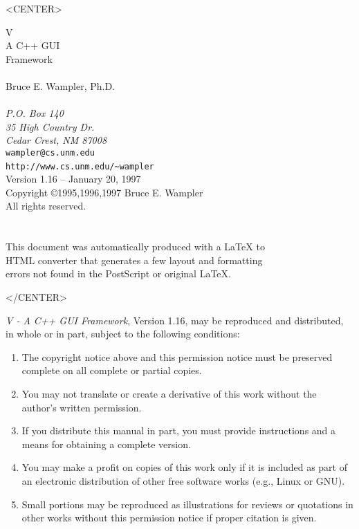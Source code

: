 \documentclass[letterpaper,draft]{book}
\begin{document}
\thispagestyle{empty}
\begin{rawhtml}
<CENTER>
\end{rawhtml}
\begin{center}
\LARGE V \\ \Large A C++ GUI \\ Framework \\
~ \\
\large Bruce E. Wampler, Ph.D. \\
\normalsize ~ \\
 \emph{P.O. Box 140} \\ 
 \emph{35 High Country Dr.} \\ 
 \emph{Cedar Crest, NM 87008} \\ 
 \texttt{wampler@cs.unm.edu} \\
 \texttt{http://www.cs.unm.edu/\~{}wampler}
 ~\\
Version 1.16 -- January 20, 1997 \\
Copyright \copyright 1995,1996,1997 Bruce E. Wampler \\
All rights reserved. \\
~\\
~\\
This document was automatically produced with a LaTeX to \\
HTML converter that generates a few layout and formatting \\
errors not found in the PostScript or original LaTeX.
\end{center}
\begin{rawhtml}
</CENTER>
\end{rawhtml}

 \setcounter{page}{2} \tableofcontents

\emph{V - A C++ GUI Framework}, Version 1.16,
may be reproduced and distributed, in whole or in part, subject
to the following conditions:

\begin{enumerate}
\item The copyright notice above and this permission notice must
be preserved complete on all complete or partial copies.

\item You may not translate or create a derivative of this work
without the author's written permission.

\item If you distribute this manual in part, you must provide
instructions and a means for obtaining a complete version.

\item You may make a profit on copies of this work only if it
is included as part of an electronic distribution of other free software
works (e.g., Linux or GNU).

\item Small portions may be reproduced as illustrations for reviews
or quotations in other works without this permission notice if proper
citation is given.

\end{enumerate}
\end{document}
